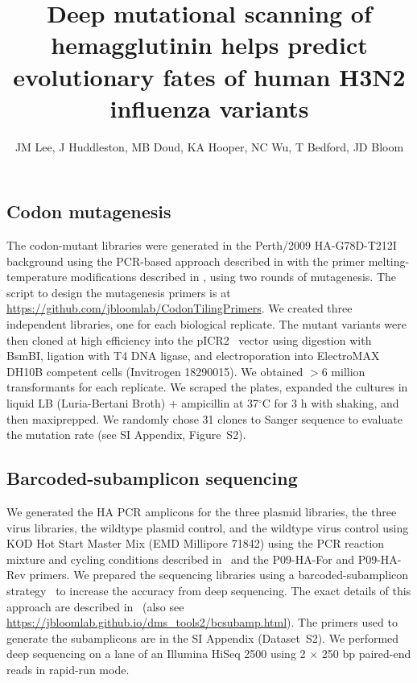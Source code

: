\documentclass[9pt,twoside,lineno]{pnas-new}
\title{Deep mutational scanning of hemagglutinin helps predict evolutionary fates of human H3N2 influenza variants}
\author{JM Lee, J Huddleston, MB Doud, KA Hooper, NC Wu, T Bedford, JD Bloom}
\begin{document}

\maketitle

\SItext

\subsection*{Codon mutagenesis}
The codon-mutant libraries were generated in the Perth/2009 HA-G78D-T212I background using the PCR-based approach described in \cite{bloom2014experimentally} with the primer melting-temperature modifications described in \cite{dingens2017comprehensive}, using two rounds of mutagenesis.
The script to design the mutagenesis primers is at \url{https://github.com/jbloomlab/CodonTilingPrimers}.
We created three independent libraries, one for each biological replicate.
The mutant variants were then cloned at high efficiency into the pICR2~\cite{ashenberg2017deep} vector using digestion with BsmBI, ligation with T4 DNA ligase, and electroporation into ElectroMAX DH10B competent cells (Invitrogen 18290015).
We obtained $>$6 million transformants for each replicate.
We scraped the plates, expanded the cultures in liquid LB (Luria-Bertani Broth) + ampicillin at 37$^{\circ}$C for 3 h with shaking, and then maxiprepped.
We randomly chose 31 clones to Sanger sequence to evaluate the mutation rate (see SI Appendix, Figure~S2).

\subsection*{Barcoded-subamplicon sequencing}
We generated the HA PCR amplicons for the three plasmid libraries, the three virus libraries, the wildtype plasmid control, and the wildtype virus control using KOD Hot Start Master Mix (EMD Millipore 71842) using the PCR reaction mixture and cycling conditions described in~\cite{bloom2014experimentally} and the P09-HA-For and P09-HA-Rev primers.
We prepared the sequencing libraries using a barcoded-subamplicon strategy~\cite{wu2014high} to increase the accuracy from deep sequencing.
The exact details of this approach are described in~\cite{doud2016accurate} (also see \url{https://jbloomlab.github.io/dms_tools2/bcsubamp.html}).
The primers used to generate the subamplicons are in the SI Appendix (Dataset~S2).
We performed deep sequencing on a lane of an Illumina HiSeq 2500 using 2 $\times$ 250 bp paired-end reads in rapid-run mode.
\end{document}
